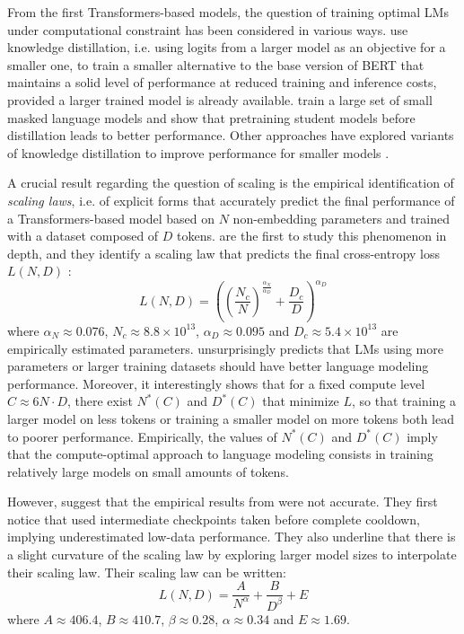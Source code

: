 From the first Transformers-based models, the question of training optimal LMs under computational constraint has been considered in various ways. \citet{sanh2019distilbert} use knowledge distillation, i.e. using logits from a larger model as an objective for a smaller one, to train a smaller alternative to the base version of BERT that maintains a solid level of performance at reduced training and inference costs, provided a larger trained model is already available. \citet{turc2019} train a large set of small masked language models and show that pretraining student models before distillation leads to better performance. Other approaches have explored variants of knowledge distillation to improve performance for smaller models \citep{Fu_Zhou_Yang_Tang_Liu_Liu_Li_2021,sun-etal-2020-contrastive}.

A crucial result regarding the question of scaling is the empirical identification of \textit{scaling laws}, i.e. of explicit forms that accurately predict the final performance of a Transformers-based model based on $N$ non-embedding parameters and trained with a dataset composed of $D$ tokens. \citet{kaplan_scaling} are the first to study this phenomenon in depth, and they identify a scaling law that predicts the final cross-entropy loss $L(N, D)$ :
\begin{equation}
    \label{eq:kaplan}
L(N, D) = \left( \left(\frac{N_c}{N}\right)^{\frac{\alpha_N}{\alpha_D}} + \frac{D_c}{D}\right)^{\alpha_D}
\end{equation}
where $\alpha_N \approx 0.076$, $N_c \approx 8.8 \times 10^{13}$, $\alpha_D \approx 0.095$ and $D_c \approx 5.4 \times 10^{13}$ are empirically estimated parameters.  unsurprisingly predicts that LMs using more parameters or larger training datasets should have better language modeling performance. Moreover, it interestingly shows that for a fixed compute level $C \approx 6 N \cdot D$, there exist $N^*(C)$ and $D^*(C)$ that minimize $L$, so that training a larger model on less tokens or training a smaller model on more tokens both lead to poorer performance. Empirically, the values of $N^*(C)$ and $D^*(C)$ imply that the compute-optimal approach to language modeling consists in training relatively large models on small amounts of tokens.

However, \citet{chinchilla_scaling} suggest that the empirical results from \citet{kaplan_scaling} were not accurate. They first notice that \citet{kaplan_scaling} used intermediate checkpoints taken before complete cooldown, implying underestimated low-data performance. They also underline that there is a slight curvature of the scaling law by exploring larger model sizes to interpolate their scaling law. Their scaling law can be written:
\begin{equation}
    \label{eq:chinchilla}
    L(N, D) = \frac{A}{N^\alpha} + \frac{B}{D^\beta} + E
\end{equation}
where $A \approx 406.4$, $B\approx 410.7$, $\beta\approx 0.28$, $\alpha\approx 0.34$ and $E\approx 1.69$.

